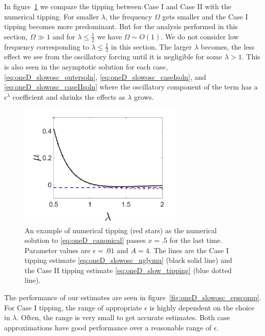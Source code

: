 In figure~\ref{fig:oneD_slowosc_lambdacomp} we compare the tipping between Case I and Case II with the numerical tipping. For smaller $\lambda$, the frequency $\Omega$ gets smaller and the Case I tipping becomes more predominant. But for the analysis performed in this section, $\Omega\gg 1$ and for $\lambda\le\frac{1}{2}$ we have $\Omega\sim O(1)$. We do not consider low frequency corresponding to $\lambda\le\frac{1}{2}$ in this section. The larger $\lambda$ becomes, the less effect we see from the oscillatory forcing until it is negligible for some $\lambda>1$. This is also seen in the asymptotic solution for each case, \eqref{eq:oneD_slowosc_outersoln}, \eqref{eq:oneD_slowosc_caseIsoln}, and \eqref{eq:oneD_slowosc_caseIIsoln} where the oscillatory component of the term has a $\epsilon^\lambda$ coefficient and shrinks the effects as $\lambda$ grows.

\begin{figure}[H]
\centering
\includegraphics[width=0.7\textwidth]{oneD/slowosc_lambdacomp.jpg}
\caption{An example of numerical tipping (red stars) as the numerical solution to \eqref{eq:oneD_canonical} passes $x=.5$ for the last time. Parameter values are $\epsilon=.01$ and $A=4$. The lines are the Case I tipping estimate \eqref{eq:oneD_slowosc_uglymu} (black solid line) and the Case II tipping estimate \eqref{eq:oneD_slow_tipping} (blue dotted line).}
\label{fig:oneD_slowosc_lambdacomp}
\end{figure} 

The performance of our estimates are seen in figure~\ref{fig:oneD_slowosc_epscomp}. For Case I tipping, the range of appropriate $\epsilon$ is highly dependent on the choice in $\lambda$. Often, the range is very small to get accurate estimates. Both case approximations have good performance over a reasonable range of $\epsilon$.


